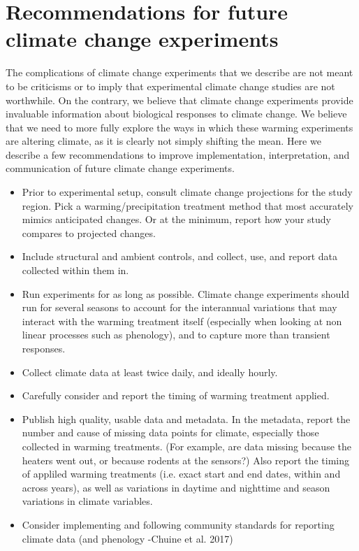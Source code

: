 \documentclass{article}
\begin{document}
\section {Recommendations for future climate change experiments}
 \par The complications of climate change experiments that  we describe are not meant to be criticisms or to imply that experimental climate change studies are not worthwhile. On the contrary, we believe that climate change experiments provide invaluable information about biological responses to climate change.
 We believe that we need to more fully explore the ways in which these warming experiments are altering climate, as it is clearly not simply shifting the mean. Here we describe a few recommendations to improve implementation, interpretation, and communication of future climate change experiments.
\begin{itemize}

\item Prior to experimental setup, consult climate change projections for the study region.  Pick a warming/precipitation treatment method that most accurately mimics anticipated changes. Or at the minimum, report how your study compares to projected changes. 
\item Include structural and ambient controls, and collect, use, and report data collected within them in. 
\item Run experiments for as long as possible. Climate change experiments should run for several seasons to account for the interannual variations that may interact with the warming treatment itself (especially when looking at non linear processes such as phenology), and to capture more than transient responses.
 \item Collect climate data at least twice daily, and ideally hourly. 
\item Carefully consider and report the timing of warming treatment applied.
 \item Publish high quality, usable data and metadata. In the metadata, report the number and cause of missing data points for climate, especially those collected in warming treatments. (For example, are data missing because the heaters went out, or because rodents at the sensors?) Also report the timing of appliled warming treatments (i.e. exact start and end dates, within and across years), as well as variations in daytime and nighttime and season variations in climate variables. 
\item Consider implementing and following community standards for reporting climate data (and phenology -Chuine et al. 2017) %

 \end{itemize}
\end{document}
